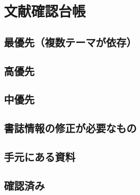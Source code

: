 
\section{文献確認台帳}

\subsection{最優先（複数テーマが依存）}

\subsection{高優先}

\subsection{中優先}

\subsection{書誌情報の修正が必要なもの}

\subsection{手元にある資料}

\subsection{確認済み}
